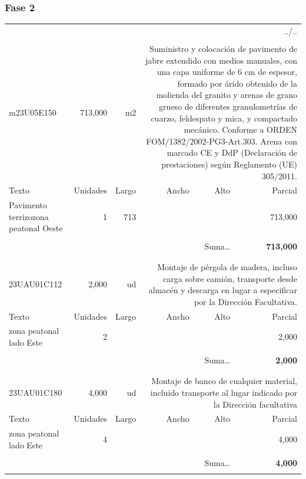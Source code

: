 \documentclass{book}%
\begin{document}
%
\subsubsection{Fase 2}%
\begin{longtable}{lrrrrr}%
\multicolumn{6}{r}{../..}\\%
\endfoot%
\endlastfoot%
&&&&&\\%
m23U05E150&   713,000& m2&\multicolumn{3}{p{6cm}}{\scriptsize Suministro y colocación de pavimento de jabre extendido con medios manuales, con una capa uniforme de 6 cm de espesor, formado por árido obtenido de la molienda del granito y arenas de grano grueso de diferentes granulometrías de cuarzo, feldespato y mica, y compactado mecánico. Conforme a ORDEN FOM/1382/2002-PG3-Art.303. Arena con marcado CE y DdP (Declaración de prestaciones) según Reglamento (UE) 305/2011.\normalsize}\\%
Texto&Unidades&Largo&Ancho&Alto&Parcial\\%
\hline%
\multicolumn{1}{p{3.5cm}}{Pavimento terrizozona peatonal  Oeste}&1&713&&&   713,000\\%
&&&&&\\%
\multicolumn{5}{r}{Suma\ldots}&\textbf{   713,000}\\%
\hline%
&&&&&\\%
&&&&&\\%
23UAU01C112&     2,000& ud&\multicolumn{3}{p{6cm}}{\scriptsize Montaje de pérgola de madera, incluso carga sobre camión, transporte desde almacén y descarga en lugar a especificar por la Dirección Facultativa.\normalsize}\\%
Texto&Unidades&Largo&Ancho&Alto&Parcial\\%
\hline%
\multicolumn{1}{p{3.5cm}}{ zona peatonal lado Este}&2&&&&     2,000\\%
&&&&&\\%
\multicolumn{5}{r}{Suma\ldots}&\textbf{     2,000}\\%
\hline%
&&&&&\\%
&&&&&\\%
23UAU01C180&     4,000& ud&\multicolumn{3}{p{6cm}}{\scriptsize Montaje de banco de cualquier material, incluido transporte al lugar indicado por la Dirección facultativa\normalsize}\\%
Texto&Unidades&Largo&Ancho&Alto&Parcial\\%
\hline%
\multicolumn{1}{p{3.5cm}}{ zona peatonal lado Este}&4&&&&     4,000\\%
&&&&&\\%
\multicolumn{5}{r}{Suma\ldots}&\textbf{     4,000}\\%
\hline%
&&&&&\\%
\end{longtable}%
\newpage
\end{document}
